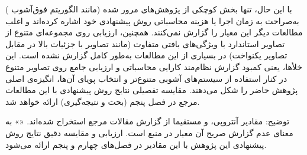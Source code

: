 با این حال، تنها بخش کوچکی از پژوهش‌های مرور شده (مانند الگوریتم فوق‌آشوب \cite{ref12}) به‌صراحت به زمان اجرا یا هزینه محاسباتی روش پیشنهادی خود اشاره کرده‌اند و اغلب مطالعات دیگر این معیار را گزارش نمی‌کنند. همچنین، ارزیابی روی مجموعه‌ای متنوع از تصاویر استاندارد با ویژگی‌های بافتی متفاوت (مانند تصاویر با جزئیات بالا در مقابل تصاویر یکنواخت) در بسیاری از این مطالعات به‌طور کامل گزارش نشده است. این خلأها، یعنی کمبود گزارش نظام‌مند کارایی محاسباتی و ارزیابی جامع روی تصاویر متنوع در کنار استفاده از سیستم‌های آشوبی متنوع‌تر و انتخاب پویای آن‌ها، انگیزه‌ی اصلی پژوهش حاضر را شکل می‌دهند. مقایسه تفصیلی نتایج روش پیشنهادی با این مطالعات مرجع در فصل پنجم (بحث و نتیجه‌گیری) ارائه خواهد شد.

\begin{table}[h]
\centering
\footnotesize
{}
\caption{جمع‌بندی تطبیقی روش‌های رمزنگاری تصویر رنگی مبتنی بر آشوب در پژوهش‌های مرجع}
\end{table}

توضیح: مقادیر آنتروپی،  و  مستقیما از گزارش مقالات مرجع استخراج شده‌اند. «\lr{---}» به معنای عدم گزارش صریح آن معیار در منبع است. ارزیابی و مقایسه دقیق نتایج روش پیشنهادی این پژوهش با این مقادیر در فصل‌های چهارم و پنجم ارائه می‌شود.